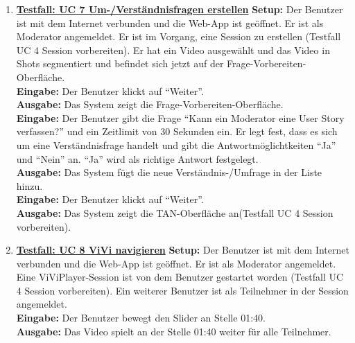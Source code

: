 \begin{enumerate}
	\item \underline{\textbf{Testfall: UC 7 Um-/Verständnisfragen erstellen}} \linebreak
	\textbf{Setup:} Der Benutzer ist mit dem Internet verbunden und die Web-App ist geöffnet. Er ist als Moderator angemeldet. Er ist im Vorgang, eine Session zu erstellen (Testfall UC 4 Session vorbereiten). Er hat ein Video ausgewählt und das Video in Shots segmentiert und befindet sich jetzt auf der Frage-Vorbereiten-Oberfläche.\\
	\textbf{Eingabe:} Der Benutzer klickt auf ``Weiter''. \\
	\textbf{Ausgabe:} Das System zeigt die Frage-Vorbereiten-Oberfläche.\\ 
	\textbf{Eingabe:} Der Benutzer gibt die Frage ``Kann ein Moderator eine User Story verfassen?'' und ein Zeitlimit von 30 Sekunden ein. Er legt fest, dass es sich um eine Verständnisfrage handelt und gibt die Antwortmöglichtkeiten ``Ja'' und ``Nein'' an. ``Ja'' wird als richtige Antwort festgelegt.\\
	\textbf{Ausgabe:} Das System fügt die neue Verständnis-/Umfrage in der Liste hinzu. \\
	\textbf{Eingabe:} Der Benutzer klickt auf ``Weiter''.\\
	\textbf{Ausgabe:} Das System zeigt die TAN-Oberfläche an(Testfall UC 4 Session vorbereiten).

	\item \underline{\textbf{Testfall: UC 8 ViVi navigieren}} \linebreak
	\textbf{Setup:} Der Benutzer ist mit dem Internet verbunden und die Web-App ist geöffnet. Er ist als Moderator angemeldet. Eine ViViPlayer-Session ist von dem Benutzer gestartet worden (Testfall UC 4 Session vorbereiten). Ein weiterer Benutzer ist als Teilnehmer in der Session angemeldet. \\
	\textbf{Eingabe:} Der Benutzer bewegt den Slider an Stelle 01:40. \\
	\textbf{Ausgabe:} Das Video spielt an der Stelle 01:40 weiter für alle Teilnehmer.\\
	

\end{enumerate}
